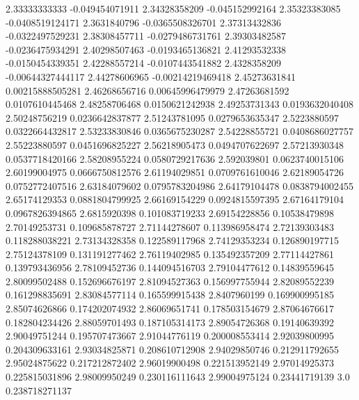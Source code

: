   2.33333333333  -0.049454071911
  2.34328358209  -0.045152992164
  2.35323383085  -0.0408519124171
   2.3631840796  -0.0365508326701
  2.37313432836  -0.0322497529231
  2.38308457711  -0.0279486731761
  2.39303482587  -0.0236475934291
  2.40298507463  -0.0193465136821
  2.41293532338  -0.0150454339351
  2.42288557214  -0.0107443541882
   2.4328358209  -0.00644327444117
  2.44278606965  -0.00214219469418
  2.45273631841  0.00215888505281
  2.46268656716  0.00645996479979
  2.47263681592  0.0107610445468
  2.48258706468  0.0150621242938
  2.49253731343  0.0193632040408
  2.50248756219  0.0236642837877
  2.51243781095  0.0279653635347
   2.5223880597  0.0322664432817
  2.53233830846  0.0365675230287
  2.54228855721  0.0408686027757
  2.55223880597  0.0451696825227
  2.56218905473  0.0494707622697
  2.57213930348  0.0537718420166
  2.58208955224  0.0580729217636
    2.592039801  0.0623740015106
  2.60199004975  0.0666750812576
  2.61194029851  0.0709761610046
  2.62189054726  0.0752772407516
  2.63184079602  0.0795783204986
  2.64179104478  0.0838794002455
  2.65174129353  0.0881804799925
  2.66169154229  0.0924815597395
  2.67164179104  0.0967826394865
   2.6815920398   0.101083719233
  2.69154228856    0.10538479898
  2.70149253731   0.109685878727
  2.71144278607   0.113986958474
  2.72139303483   0.118288038221
  2.73134328358   0.122589117968
  2.74129353234   0.126890197715
  2.75124378109   0.131191277462
  2.76119402985   0.135492357209
  2.77114427861   0.139793436956
  2.78109452736   0.144094516703
  2.79104477612    0.14839559645
  2.80099502488   0.152696676197
  2.81094527363   0.156997755944
  2.82089552239   0.161298835691
  2.83084577114   0.165599915438
   2.8407960199   0.169900995185
  2.85074626866   0.174202074932
  2.86069651741   0.178503154679
  2.87064676617   0.182804234426
  2.88059701493   0.187105314173
  2.89054726368    0.19140639392
  2.90049751244   0.195707473667
  2.91044776119   0.200008553414
  2.92039800995   0.204309633161
  2.93034825871   0.208610712908
  2.94029850746   0.212911792655
  2.95024875622   0.217212872402
  2.96019900498   0.221513952149
  2.97014925373   0.225815031896
  2.98009950249   0.230116111643
  2.99004975124    0.23441719139
            3.0   0.238718271137
